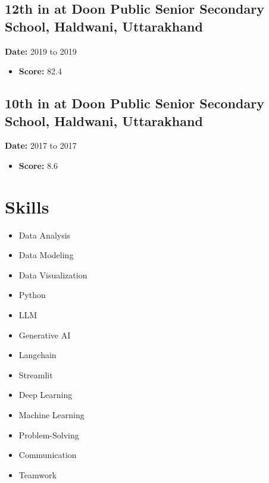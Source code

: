 \documentclass{article}
\begin{document}
\subsection{12th in  at Doon Public Senior Secondary School, Haldwani, Uttarakhand}
\textbf{Date:} 2019 to 2019
\begin{itemize}[label=-]
\item \textbf{Score:} 82.4
\end{itemize}

\subsection{10th in  at Doon Public Senior Secondary School, Haldwani, Uttarakhand}
\textbf{Date:} 2017 to 2017
\begin{itemize}[label=-]
\item \textbf{Score:} 8.6
\end{itemize}

\section{Skills}
\begin{itemize}
\item Data Analysis
\item Data Modeling
\item Data Visualization
\item Python
\item LLM
\item Generative AI
\item Langchain
\item Streamlit
\item Deep Learning
\item Machine Learning
\item Problem-Solving
\item Communication
\item Teamwork
\end{itemize}
\end{document}
